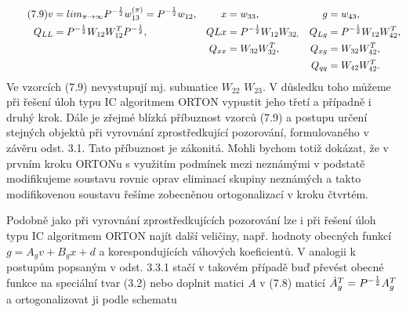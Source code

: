 %
\begin{align*}
  \tag{7.9}
    v &= lim_{\pi \rightarrow \infty} P^{-{1\over2}}w_{13}^{(\pi)}
    = P^{-{1\over2}}w_{12}, &  x &= w_{33}, & g &= w_{43}, \\
    Q_{LL} &= P^{-{1\over2}}W_{12}W_{12}^TP^{-{1\over2}}, &
    QLx &= P^{-{1\over2}}W_{12}W_{32,} & Q_{Lg} &= P^{-{1\over2}}W_{12}W_{42}^T,\\
    && Q_{xx} &= W_{32}W_{32}^T,   &   Q_{xg} &= W_{32}W_{42}^T, \\
    &&&&   Q_{qq} &= W_{42}W_{42}^T .
\end{align*}
%
Ve vzorcích (7.9) nevystupují mj. submatice $W_{22}$ $W_{23}$.  V
důsledku toho můžeme při řešení úloh typu IC algoritmem ORTON vypustit
jeho třetí a případně i druhý krok.  Dále je zřejmé blízká příbuznost
vzorců (7.9) a postupu určení stejných objektů při vyrovnání
zprostředkující pozorování, formulovaného v závěru odst. 3.1. Tato
příbuznost je zákonitá. Mohli bychom totiž dokázat, že v prvním kroku
ORTONu s využitím podmínek mezi neznámými v podstatě modifikujeme
soustavu rovnic oprav eliminací skupiny neznámých a takto
modifikovenou soustavu řešíme zobecněnou ortogonalizací v kroku
čtvrtém.


Podobně jako při vyrovnání zprostředkujících pozorování lze i při
řešení úloh typu IC algoritmem ORTON najít další veličiny,
např. hodnoty obecných funkcí $g = A_g v + B_gx + d$ a
korespondujících váhových koeficientů. V analogii k postupům popsaným
v odst.  3.3.1 stačí v takovém případě buď převést obecné funkce na
speciální tvar (3.2) nebo doplnit matici $A$ v (7.8) maticí $\dot
A^T_g = P^{-{1\over2}} A^T_g $ a ortogonalizovat ji podle schematu

